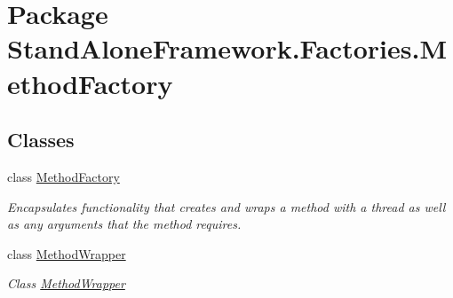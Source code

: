 \hypertarget{namespace_stand_alone_framework_1_1_factories_1_1_method_factory}{\section{Package Stand\+Alone\+Framework.\+Factories.\+Method\+Factory}
\label{namespace_stand_alone_framework_1_1_factories_1_1_method_factory}
}
\subsection*{Classes}
\begin{DoxyCompactItemize}
\item 
class \hyperlink{class_stand_alone_framework_1_1_factories_1_1_method_factory_1_1_method_factory}{Method\+Factory}
\begin{DoxyCompactList}\small\item\em Encapsulates functionality that creates and wraps a method with a thread as well as any arguments that the method requires. \end{DoxyCompactList}\item 
class \hyperlink{class_stand_alone_framework_1_1_factories_1_1_method_factory_1_1_method_wrapper}{Method\+Wrapper}
\begin{DoxyCompactList}\small\item\em Class \hyperlink{class_stand_alone_framework_1_1_factories_1_1_method_factory_1_1_method_wrapper}{Method\+Wrapper} \end{DoxyCompactList}\end{DoxyCompactItemize}
